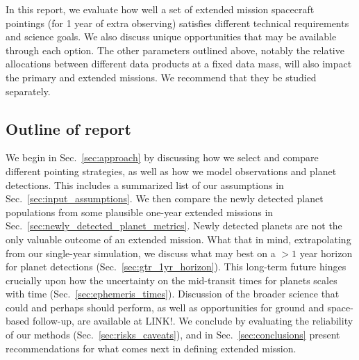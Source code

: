 In this report, we evaluate how well a set of extended mission spacecraft pointings (for 1 year of extra observing) satisfies different technical requirements and science goals. 
We also discuss unique opportunities that may be available through each option.
The other parameters outlined above, notably the relative allocations between different data products at a fixed data mass, will also impact the primary and extended missions. We recommend that they be studied separately.


\subsection{Outline of report}
We begin in Sec.~\ref{sec:approach} by discussing how we select and compare different pointing strategies, as well as how we model \tesss observations and planet detections.
This includes a summarized list of our assumptions in Sec.~\ref{sec:input_assumptions}.
We then compare the newly detected planet populations from some plausible one-year extended missions in Sec.~\ref{sec:newly_detected_planet_metrics}. 
Newly detected planets are not the only valuable outcome of an extended mission.
What that in mind, extrapolating from our single-year simulation, we discuss what may best on a $>1$ year horizon for planet detections (Sec.~\ref{sec:gtr_1yr_horizon}).
This long-term future hinges crucially upon how the uncertainty on the mid-transit times for \tess planets scales with time (Sec.~\ref{sec:ephemeris_times}).
Discussion of the broader science that \tess could and perhaps should perform, as well as opportunities for ground and space-based follow-up, are available at LINK!.
We conclude by evaluating the reliability of our methods (Sec.~\ref{sec:risks_caveats}), and in Sec.~\ref{sec:conclusions} present recommendations for what comes next in defining \tesss extended mission.
